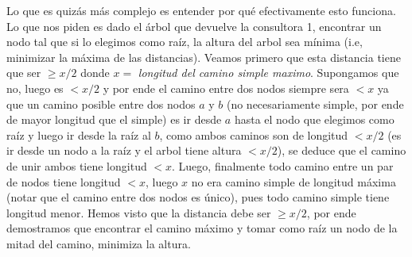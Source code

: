\documentclass[A4paper,oneside,fleqn,11pt]{article}
\theoremstyle{definition}
\begin{document}
Lo que es quizás más complejo es entender por qué efectivamente esto funciona. Lo que nos piden es dado el árbol que devuelve la consultora 1, encontrar un nodo tal que si lo elegimos como raíz, la altura del arbol sea mínima (i.e, minimizar la máxima de las distancias). Veamos primero que esta distancia tiene que ser $\geq x/2$ donde $x =$ \textit{longitud del camino simple maximo}. Supongamos que no, luego es $<x/2$ y por ende el camino entre dos nodos siempre sera $<x$ ya que un camino posible entre dos nodos $a$ y $b$ (no necesariamente simple, por ende de mayor longitud que el simple) es ir desde $a$ hasta el nodo que elegimos como raíz y luego ir desde la raíz al $b$, como ambos caminos son de longitud $<x/2$ (es ir desde un nodo a la raíz y el arbol tiene altura $<x/2$), se deduce que el camino de unir ambos tiene longitud $<x$. Luego, finalmente todo camino entre un par de nodos tiene longitud $<x$, luego $x$ no era camino simple de longitud máxima (notar que el camino entre dos nodos es único), pues todo camino simple tiene longitud menor. Hemos visto que la distancia debe ser $\geq x/2$, por ende demostramos que encontrar el camino máximo y tomar como raíz un nodo de la mitad del camino, minimiza la altura.
\end{document}
